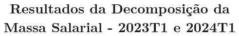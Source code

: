 \documentclass{article}
\begin{document}
	
	\title{Resultados da Decomposição da Massa Salarial - 2023T1 e 2024T1}
	\maketitle
	
	\begin{flushleft} %
	\end{flushleft} %
	
	
\end{document}
